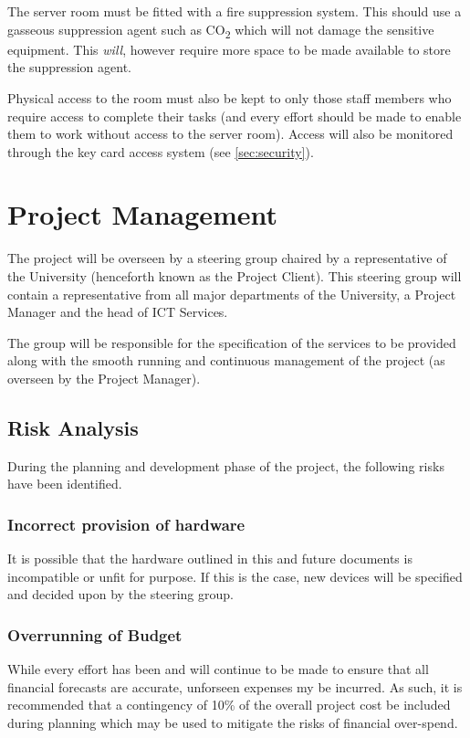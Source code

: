 \documentclass[a4paper, twoside]{article}
\begin{document}
The server room must be fitted with a fire suppression system. This should use a
gasseous suppression agent such as CO\textsubscript{2} which will not damage the
sensitive equipment. This \emph{will}, however require more space to be made
available to store the suppression agent.

Physical access to the room must also be kept to only those staff members who
require access to complete their tasks (and every effort should be made to
enable them to work without access to the server room). Access will also be
monitored through the key card access system (see \ref{sec:security}).

\section{Project Management}
\label{sec:projman}
The project will be overseen by a steering group chaired by a representative of
the University (henceforth known as the Project Client). This steering group
will contain a representative from all major departments of the University, a
Project Manager and the head of ICT Services.

The group will be responsible for the specification of the services to be
provided along with the smooth running and continuous management of the project
(as overseen by the Project Manager).

\subsection{Risk Analysis}
During the planning and development phase of the project, the following risks
have been identified.

\subsubsection{Incorrect provision of hardware}
It is possible that the hardware outlined in this and future documents is
incompatible or unfit for purpose. If this is the case, new devices will be
specified and decided upon by the steering group.

\subsubsection{Overrunning of Budget}
While every effort has been and will continue to be made to ensure that all
financial forecasts are accurate, unforseen expenses my be incurred. As such, it
is recommended that a contingency of 10\% of the overall project cost be
included during planning which may be used to mitigate the risks of financial
over-spend.
\end{document}
